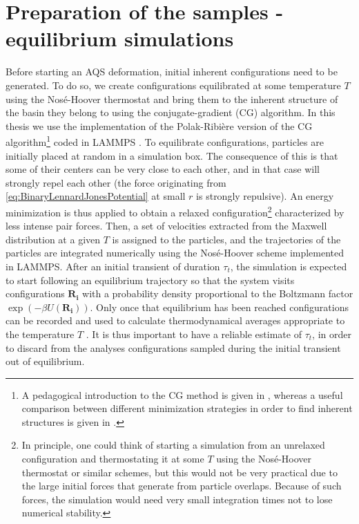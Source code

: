 \section{Preparation of the samples - equilibrium simulations}

Before starting an AQS deformation, initial inherent configurations need to be generated. To do so, we create configurations equilibrated at some temperature $T$ using the Nos\'e-Hoover thermostat and bring them to the inherent structure of the basin they belong to using the conjugate-gradient (CG) algorithm. In this thesis we use the implementation of the Polak-Ribi\`ere version of the CG algorithm\footnote{A pedagogical introduction to the CG method is given in \cite{shewchuk1994introduction}, whereas a useful comparison between different minimization strategies in order to find inherent structures is given in \cite{chakravarty2005generating}.} coded in LAMMPS \cite{plimpton1995fast}.
To equilibrate configurations, particles are initially placed at random in a simulation box. The consequence of this is that some of their centers can be very close to each other, and in that case will strongly repel each other (the force originating from \autoref{eq:BinaryLennardJonesPotential} at small $r$ is strongly repulsive). An energy minimization is thus applied to obtain a relaxed configuration\footnote{In principle, one could think of starting a simulation from an unrelaxed configuration and thermostating it at some $T$ using the Nos\'e-Hoover thermostat or similar schemes, but this would not be very practical due to the large initial forces that generate from particle overlaps. Because of such forces, the simulation would need very small integration times not to lose numerical stability.} characterized by less intense pair forces. 
Then, a set of velocities extracted from the Maxwell distribution at a given $T$ is assigned to the particles, and the trajectories of the particles are integrated numerically using the Nos\'e-Hoover scheme implemented in LAMMPS.
After an initial transient of duration $\tau_{t}$, the simulation is expected to start following an equilibrium trajectory so that the system visits configurations $\mathbf{R_{i}}$ with a probability density proportional to the Boltzmann factor $\exp(-\beta U(\mathbf{R_{i}}))$. 
Only once that equilibrium has been reached configurations can be recorded and used to calculate thermodynamical averages appropriate to the temperature $T$ \cite{frenkel2001understanding}. It is thus important to have a reliable estimate of $\tau_{t}$, in order to discard from the analyses configurations sampled during the initial transient out of equilibrium.
